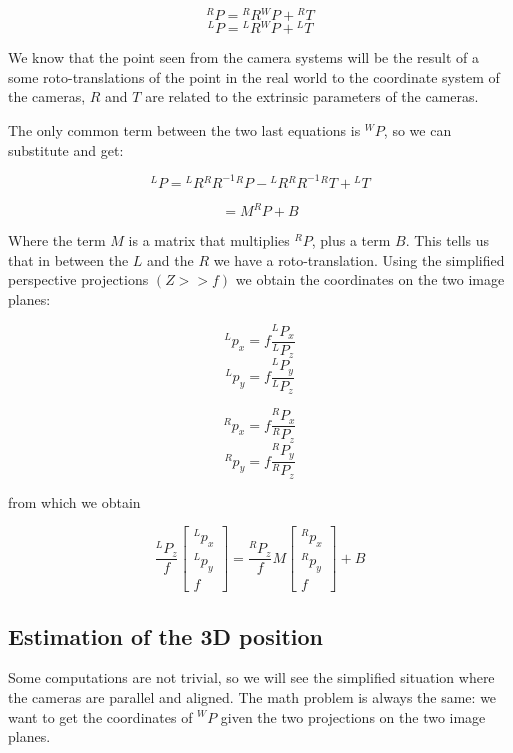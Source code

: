 \[
    {}^RP = {}^RR{}^WP+{}^RT
\]
\[
    {}^LP = {}^LR{}^WP+{}^LT  
\]

We know that the point seen from the camera systems will be the result of a some roto-translations of the point in the real world to the coordinate system of the cameras, \(R\) and \(T\) are related to the extrinsic parameters of the cameras.

The only common term between the two last equations is \({}^WP\), so we can substitute and get:

\[
    {}^LP = {}^LR{}^RR^{-1}{}^RP-{}^LR{}^RR^{-1}{}^RT+{}^LT
\]

\[
    = M^RP+B
\]

Where the term \(M\) is a matrix that multiplies \({}^RP\), plus a term \(B\). This tells us that in between the \(L\) and the \(R\) we have a roto-translation. Using the simplified perspective projections $(Z >> f)$ we obtain the coordinates on the two image planes:

\begin{multicols}{2}

\[
    {}^Lp_x = f\frac{{}^LP_x}{{}^LP_z}  
\] 
\[
    {}^Lp_y = f\frac{{}^LP_y}{{}^LP_z}
\]

\end{multicols}

\begin{multicols}{2}

\[
    {}^Rp_x = f\frac{{}^RP_x}{{}^RP_z}  
\] 
\[
    {}^Rp_y = f\frac{{}^RP_y}{{}^RP_z}
\]
    
\end{multicols}

from which we obtain 

\[
    \frac{{}^LP_z}{f}
    \begin{bmatrix}
        {}^Lp_x \\
        {}^Lp_y \\
        f
    \end{bmatrix}
    =
    \frac{{}^RP_z}{f}
    M
    \begin{bmatrix}
        {}^Rp_x \\
        {}^Rp_y \\
        f 
    \end{bmatrix}
    + B
\]

\subsection{Estimation of the 3D position}

Some computations are not trivial, so we will see the simplified situation where the cameras are parallel and aligned. The math problem is always the same: we want to get the coordinates of \({}^WP\) given the two projections on the two image planes.

